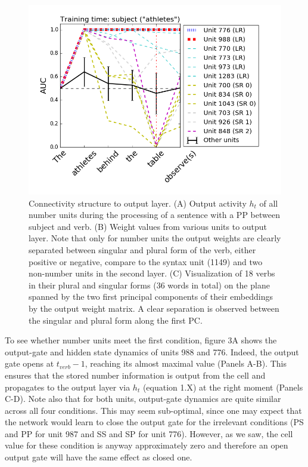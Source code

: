 \begin{figure}[t]
\centering
\includegraphics[width=\textwidth]{Figures/Figure4_GAT_SR_vs_LR.png}
\caption{Connectivity structure to output layer. 
(A) Output activity $h_t$ of all number units during the processing of a sentence with a PP between subject and verb. 
(B) Weight values from various units to output layer. 
Note that only for number units the output weights are clearly separated between singular and plural form of the verb, either positive or negative, compare to the syntax unit (1149) and two non-number units in the second layer. 
(C) Visualization of 18 verbs in their plural and singular forms (36 words in total) on the plane spanned by the two first principal components of their embeddings by the output weight matrix. 
A clear separation is observed between the singular and plural form along the first PC.}
\end{figure}

To see whether number units meet the first condition, figure 3A shows the output-gate and hidden state dynamics of units 988 and 776. 
Indeed, the output gate opens at $t_{verb}-1$, reaching its almost maximal value (Panels A-B). 
This ensures that the stored number information is output from the cell and propagates to the output layer via $h_t$ (equation 1.X) at the right moment (Panels C-D). 
Note also that for both units, output-gate dynamics are quite similar across all four conditions. 
This may seem sub-optimal, since one may expect that the network would learn to close the output gate for the irrelevant conditions (PS and PP for unit 987 and SS and SP for unit 776). 
However, as we saw, the cell value for these condition is anyway approximately zero and therefore an open output gate will have the same effect as closed one.

